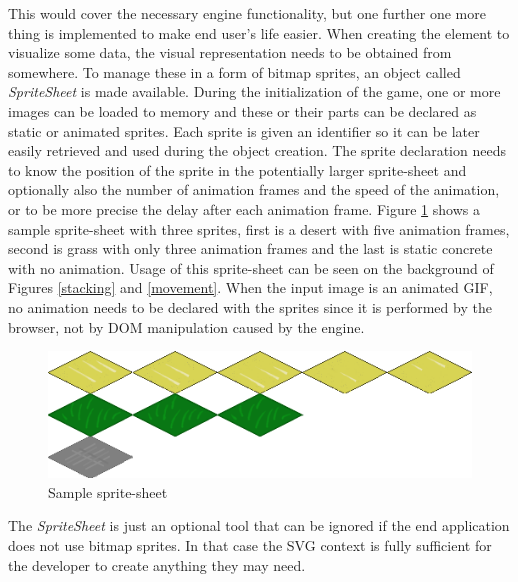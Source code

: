 \documentclass[11pt,oneside, final]{fithesis2}
\begin{document}
This would cover the necessary engine functionality, but one further one more thing is implemented to make end user's life easier. When creating the element to visualize some data, the visual representation needs to be obtained from somewhere. To manage these in a form of bitmap sprites, an object called \emph{SpriteSheet} is made available. During the initialization of the game, one or more images can be loaded to memory and these or their parts can be declared as static or animated sprites. Each sprite is given an identifier so it can be later easily retrieved and used during the object creation. The sprite declaration needs to know the position of the sprite in the potentially larger sprite-sheet and optionally also the number of animation frames and the speed of the animation, or to be more precise the delay after each animation frame. Figure \ref{spritesheet} shows a sample sprite-sheet with three sprites, first is a desert with five animation frames, second is grass with only three animation frames and the last is static concrete with no animation. Usage of this sprite-sheet can be seen on the background of Figures \ref{stacking} and \ref{movement}. When the input image is an animated GIF, no animation needs to be declared with the sprites since it is performed by the browser, not by DOM manipulation caused by the engine.

\begin{figure}[h]
	\centering
	\includegraphics[width=\textwidth]{thesis-spritesheet}
	\caption{Sample sprite-sheet}
	\label{spritesheet}
\end{figure}

The \emph{SpriteSheet} is just an optional tool that can be ignored if the end application does not use bitmap sprites. In that case the SVG context is fully sufficient for the developer to create anything they may need.
\end{document}
